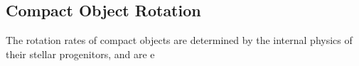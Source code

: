 {\color{orange}

\subsection{Compact Object Rotation}

The rotation rates of compact objects are determined by the internal physics of their stellar progenitors, and are e

}